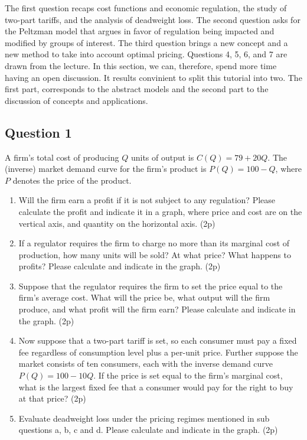 \documentclass[11pt]{article} %
\begin{document}
The first question recaps cost functions and economic regulation, the study of two-part tariffs, and the analysis of deadweight loss. The second question asks for the Peltzman model that argues in favor of regulation being impacted and modified by groups of interest. The third question brings a new concept and a new method to take into account optimal pricing. Questions 4, 5, 6, and 7 are drawn from the lecture. In this section, we can, therefore, spend more time having an open discussion. It results convinient to split this tutorial into two. The first part, corresponds to the abstract models and the second part to the discussion of concepts and applications.


\subsection{Question 1}
A firm’s total cost of producing $Q$ units of output is $C\left(Q\right)=79+20Q$. The (inverse) market demand curve for the firm’s product is $P\left(Q\right)=100-Q$, where $P$ denotes the price of the product.

\begin{enumerate}
\item	Will the firm earn a profit if it is not subject to any regulation? Please calculate the profit and indicate it in a graph, where price and cost are on the vertical axis, and quantity on the horizontal axis. (2p)
\item 	If a regulator requires the firm to charge no more than its marginal cost of production, how many units will be sold? At what price? What happens to profits? Please calculate and indicate in the graph. (2p)
\item Suppose that the regulator requires the firm to set the price equal to the firm’s average cost. What will the price be, what output will the firm produce, and what profit will the firm earn? Please calculate and indicate in the graph. (2p)
	\item Now suppose that a two-part tariff is set, so each consumer must pay a fixed fee regardless of consumption level plus a per-unit price. Further suppose the market consists of ten consumers, each with the inverse demand curve $P\left(Q\right)=100-10Q$. If the price is set equal to the firm’s marginal cost, what is the largest fixed fee that a consumer would pay for the right to buy at that price? (2p)
\item 	Evaluate deadweight loss under the pricing regimes mentioned in sub questions a, b, c and d. Please calculate and indicate in the graph. (2p)
\end{enumerate}
\end{document}
